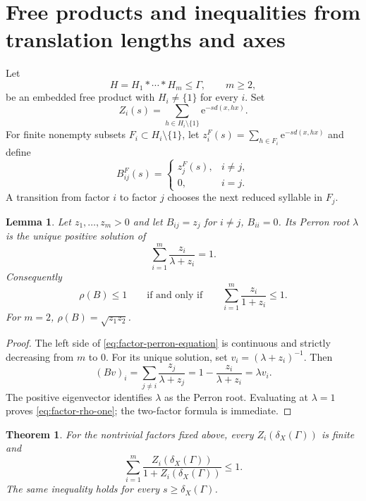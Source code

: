 \documentclass[11pt]{article}
\newtheorem{theorem}{Theorem}[section]
\newtheorem{lemma}[lemma]{Lemma}
\theoremstyle{definition}
\newcommand{\e}{\mathrm e}
\begin{document}
\section{Free products and inequalities from translation lengths and axes}
\label{sec:free-products}

Let
\[
 H=H_1*\cdots*H_m\le\Gamma,
 \qquad m\ge2,
\]
be an embedded free product with $H_i\ne\{1\}$ for every $i$.  Set
\begin{equation}\label{eq:factor-series}
 Z_i(s)=\sum_{h\in H_i\setminus\{1\}}\e^{-sd(x,hx)}.
\end{equation}
For finite nonempty subsets $F_i\subset H_i\setminus\{1\}$, let
$z_i^F(s)=\sum_{h\in F_i}\e^{-sd(x,hx)}$ and define
\[
 B^F_{ij}(s)=
 \begin{cases}
 z_j^F(s),&i\ne j,\\
 0,&i=j.
 \end{cases}
\]
A transition from factor $i$ to factor $j$ chooses the next reduced syllable in $F_j$.

\begin{lemma}
\label{lem:factor-perron}
Let $z_1,\dots,z_m>0$ and let $B_{ij}=z_j$ for $i\ne j$, $B_{ii}=0$.  Its Perron root
$\lambda$ is the unique positive solution of
\begin{equation}\label{eq:factor-perron-equation}
 \sum_{i=1}^m\frac{z_i}{\lambda+z_i}=1.
\end{equation}
Consequently
\begin{equation}\label{eq:factor-rho-one}
 \rho(B)\le1
 \qquad\mbox{if and only if}\qquad
 \sum_{i=1}^m\frac{z_i}{1+z_i}\le1.
\end{equation}
For $m=2$, $\rho(B)=\sqrt{z_1z_2}$.
\end{lemma}

\begin{proof}
The left side of \eqref{eq:factor-perron-equation} is continuous and strictly decreasing from
$m$ to $0$.  For its unique solution, set $v_i=(\lambda+z_i)^{-1}$.  Then
\[
 (Bv)_i=\sum_{j\ne i}\frac{z_j}{\lambda+z_j}
 =1-\frac{z_i}{\lambda+z_i}=\lambda v_i.
\]
The positive eigenvector identifies $\lambda$ as the Perron root.  Evaluating at
$\lambda=1$ proves \eqref{eq:factor-rho-one}; the two-factor formula is immediate.
\end{proof}

\begin{theorem}
\label{thm:factor-series}
For the nontrivial factors fixed above, every $Z_i(\delta_X(\Gamma))$ is finite and
\begin{equation}\label{eq:factor-series-inequality}
 \sum_{i=1}^m
 \frac{Z_i(\delta_X(\Gamma))}{1+Z_i(\delta_X(\Gamma))}
 \le1.
\end{equation}
The same inequality holds for every $s\ge\delta_X(\Gamma)$.
\end{theorem}
\end{document}
